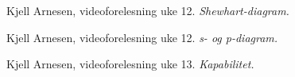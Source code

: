 \documentclass[12pt]{article}
\begin{document}
\pagebreak
\renewcommand\refname{Referanser}
\begin{thebibliography}{}

Kjell Arnesen, videoforelesning uke 12.
\textit{Shewhart-diagram.}

Kjell Arnesen, videoforelesning uke 12.
\textit{s- og p-diagram.}

Kjell Arnesen, videoforelesning uke 13.
\textit{Kapabilitet.}


\end{thebibliography}







	
	
	
	
	
	
	
	
\end{document}
